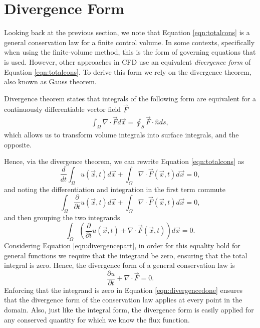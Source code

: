 \section{Divergence Form}
Looking back at the previous section, we note that Equation \ref{eqn:totalcons} is a general conservation law for a finite control volume. In some contexts, specifically when using the finite-volume method, this is the form of governing equations that is used. However, other approaches in CFD use an equivalent {\it divergence form} of Equation \ref{eqn:totalcons}. To derive this form we rely on the divergence theorem, also known as Gauss theorem.
\begin{theorem}
Divergence theorem states that integrals of the following form are equivalent for a continuously differentiable vector field $\vec{F}$
\begin{align}
\int_\Omega \nabla \cdot \vec{F} d\vec{x} = \oint_S \vec{F} \cdot \hat{n} ds,
\end{align}
which allows us to transform volume integrals into surface integrals, and the opposite.
\end{theorem}
Hence, via the divergence theorem, we can rewrite Equation \ref{eqn:totalcons} as
\begin{equation}
	\frac{d}{dt}\int_\Omega u(\vec{x},t) d\vec{x} + \int_\Omega \nabla \cdot \vec{F}(\vec{x},t) d\vec{x} = 0,
\end{equation}
and noting the differentiation and integration in the first term commute
\begin{equation}
	\int_\Omega \frac{\partial}{\partial t} u(\vec{x},t) d\vec{x} + \int_\Omega \nabla \cdot \vec{F}(\vec{x},t) d\vec{x} = 0,
\end{equation}
and then grouping the two integrands
\begin{equation}
	\label{eqn:divergencepart}
	\int_\Omega \left( \frac{\partial}{\partial t} u(\vec{x},t) + \nabla \cdot \vec{F}(\vec{x},t) \right) d\vec{x} = 0.
\end{equation}
Considering Equation \ref{eqn:divergencepart}, in order for this equality hold for general functions we require that the integrand be zero, ensuring that the total integral is zero. Hence, the divergence form of a general conservation law is
\begin{equation}
	\label{eqn:divergencedone}
	\frac{\partial u}{\partial t} + \nabla \cdot \vec{F} = 0.
\end{equation}
Enforcing that the integrand is zero in Equation \ref{eqn:divergencedone} ensures that the divergence form of the conservation law applies at every point in the domain. Also, just like the integral form, the divergence form is easily applied for any conserved quantity for which we know the flux function.

